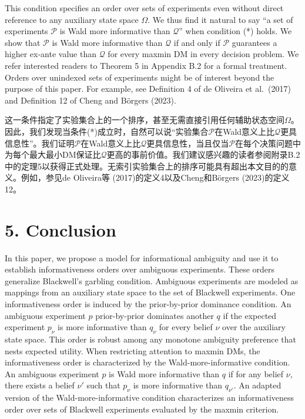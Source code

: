 \documentclass[12pt,a4paper]{article}
\newenvironment{original}
  {\par\vspace{4pt}\noindent\color{black}\ignorespaces}
  {\par\vspace{2pt}}
\newenvironment{translation}
  {\par\vspace{2pt}\noindent\color{myblue}\ignorespaces}
  {\par\vspace{6pt}}
\newcommand{\bisection}[2]{%
  \section{#1}%
  \vspace{-2pt}%
  \noindent{\color{myblue}\large\bfseries #2}%
  \vspace{6pt}%
}
\begin{document}
\begin{original}
This condition specifies an order over sets of experiments even without direct reference to any auxiliary state space $\Omega$. We thus find it natural to say ``a set of experiments $\mathcal{P}$ is Wald more informative than $\mathcal{Q}$'' when condition (*) holds. We show that $\mathcal{P}$ is Wald more informative than $\mathcal{Q}$ if and only if $\mathcal{P}$ guarantees a higher ex-ante value than $\mathcal{Q}$ for every maxmin DM in every decision problem. We refer interested readers to Theorem 5 in Appendix B.2 for a formal treatment. Orders over unindexed sets of experiments might be of interest beyond the purpose of this paper. For example, see Definition 4 of de Oliveira et al.\ (2017) and Definition 12 of Cheng and B\"{o}rgers (2023).
\end{original}

\begin{translation}
这一条件指定了实验集合上的一个排序，甚至无需直接引用任何辅助状态空间$\Omega$。因此，我们发现当条件(*)成立时，自然可以说``实验集合$\mathcal{P}$在Wald意义上比$\mathcal{Q}$更具信息性''。我们证明$\mathcal{P}$在Wald意义上比$\mathcal{Q}$更具信息性，当且仅当$\mathcal{P}$在每个决策问题中为每个最大最小DM保证比$\mathcal{Q}$更高的事前价值。我们建议感兴趣的读者参阅附录B.2中的定理5以获得正式处理。无索引实验集合上的排序可能具有超出本文目的的意义。例如，参见de Oliveira等 (2017)的定义4以及Cheng和B\"{o}rgers (2023)的定义12。
\end{translation}


\bisection{5. Conclusion}{5. 结论}

\begin{original}
In this paper, we propose a model for informational ambiguity and use it to establish informativeness orders over ambiguous experiments. These orders generalize Blackwell's garbling condition. Ambiguous experiments are modeled as mappings from an auxiliary state space to the set of Blackwell experiments. One informativeness order is induced by the prior-by-prior dominance condition. An ambiguous experiment $p$ prior-by-prior dominates another $q$ if the expected experiment $p_{\nu}$ is more informative than $q_{\nu}$ for every belief $\nu$ over the auxiliary state space. This order is robust among any monotone ambiguity preference that nests expected utility. When restricting attention to maxmin DMs, the informativeness order is characterized by the Wald-more-informative condition. An ambiguous experiment $p$ is Wald more informative than $q$ if for any belief $\nu$, there exists a belief $\nu'$ such that $p_{\nu}$ is more informative than $q_{\nu'}$. An adapted version of the Wald-more-informative condition characterizes an informativeness order over sets of Blackwell experiments evaluated by the maxmin criterion.
\end{original}
\end{document}
